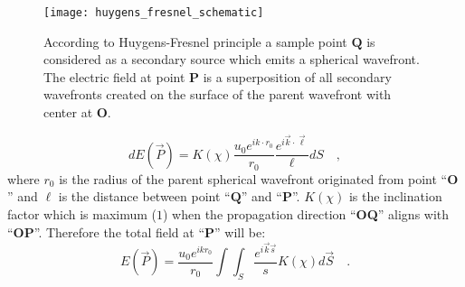 \begin{figure}[t!]
  \centering
  \texttt{[image: huygens\_fresnel\_schematic]}
  \caption{According to Huygens-Fresnel principle a sample point $\mathbf{Q}$ is considered as a secondary source which emits a spherical wavefront. The electric field at point $\mathbf{P}$ is a superposition of all secondary wavefronts created on the surface of the parent wavefront with center at $\mathbf{O}$.}
  \label{fig:huygens_fresnel}
\end{figure}


\begin{equation}
\label{eq:huygen_fresnel}
dE(\vec{P}) = K(\chi) \frac{u_0 e^{ik \cdot r_0}}{r_0}\frac{e^{i\vec{k}\cdot\vec{\ell}}}{\ell} dS \quad ,
\end{equation}
where $r_0$ is the radius of the parent spherical wavefront originated from point ``$\mathbf{O}$'' and $\ell$ is the distance between point ``$\mathbf{Q}$'' and ``$\mathbf{P}$''. $K(\chi)$ is the inclination factor which is maximum ($1$) when the propagation direction ``\textbf{OQ}'' aligns with ``\textbf{OP}''. Therefore the total field at ``\textbf{P}'' will be:
\begin{equation}
\label{eq:E_P}
E(\vec{P}) =  \frac{u_0 e^{ikr_0}}{r_0} \int \int _{S} \frac{e^{i\vec{k}\vec{s}}}{s}  K(\chi) d\vec{S} \quad .
\end{equation}

